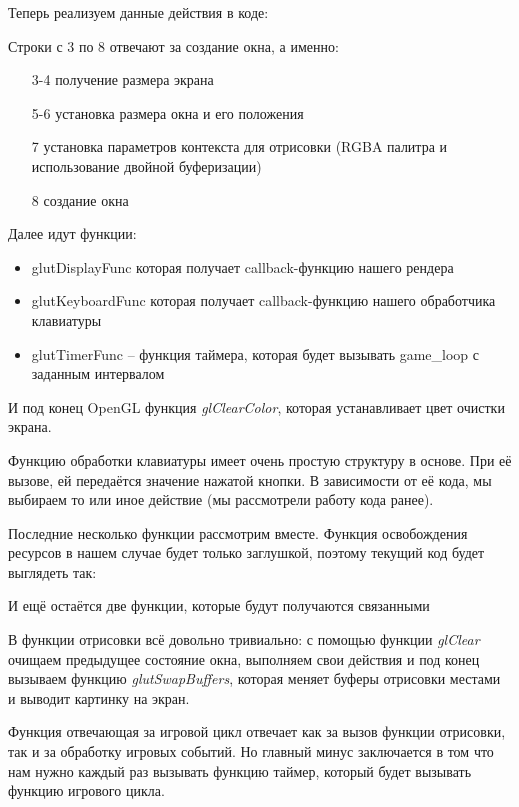 Теперь реализуем данные действия в коде:


Строки с 3 по 8 отвечают за создание окна, а именно:
\begin{itemize}\itemsep-5pt
    \item[3-4] получение размера экрана
    \item[5-6] установка размера окна и его положения
    \item[7] установка параметров контекста для отрисовки 
        (RGBA палитра и использование двойной буферизации)
    \item[8] создание окна
\end{itemize}

Далее идут функции:
\begin{itemize}\itemsep-5pt
    \item glutDisplayFunc которая получает callback-функцию нашего рендера
    \item glutKeyboardFunc которая получает callback-функцию нашего обработчика клавиатуры
    \item glutTimerFunc -- функция таймера, которая будет вызывать game\_loop с заданным интервалом
\end{itemize}

И под конец OpenGL функция \emph{glClearColor}, которая устанавливает цвет очистки экрана.

Функцию обработки клавиатуры имеет очень простую структуру в основе. При её вызове, ей передаётся 
значение нажатой кнопки. В зависимости от её кода, мы выбираем то или иное действие (мы рассмотрели 
работу кода ранее).

Последние несколько функции рассмотрим вместе. Функция освобождения ресурсов в нашем случае будет только 
заглушкой, поэтому текущий код будет выглядеть так:


И ещё остаётся две функции, которые будут получаются связанными


В функции отрисовки всё довольно тривиально: с помощью функции \emph{glClear} очищаем предыдущее 
состояние окна, выполняем свои действия и под конец вызываем функцию \emph{glutSwapBuffers}, которая 
меняет буферы отрисовки местами и выводит картинку на экран.

Функция отвечающая за игровой цикл отвечает как за вызов функции отрисовки, так и за обработку игровых 
событий. Но главный минус заключается в том что нам нужно каждый раз вызывать функцию таймер, который 
будет вызывать функцию игрового цикла.

